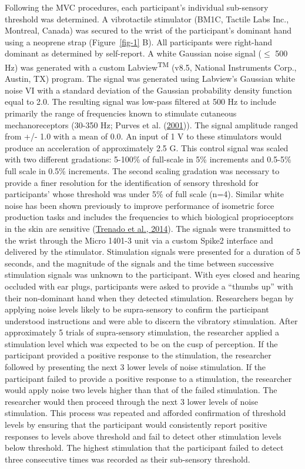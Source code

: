\documentclass[]{cik}%
\begin{document}
Following the MVC procedures, each participant's individual sub-sensory
threshold was determined. A vibrotactile stimulator (BM1C, Tactile Labs
Inc., Montreal, Canada) was secured to the wrist of the participant's
dominant hand using a neoprene strap (Figure~\ref{fig-1} B). All
participants were right-hand dominant as determined by self-report. A
white Gaussian noise signal (\(\le\) 500 Hz) was generated with a custom
Labview\textsuperscript{TM} (v8.5, National Instruments Corp., Austin,
TX) program. The signal was generated using Labview's Gaussian white
noise VI with a standard deviation of the Gaussian probability density
function equal to 2.0. The resulting signal was low-pass filtered at 500
Hz to include primarily the range of frequencies known to stimulate
cutaneous mechanoreceptors (30-350 Hz; Purves et al.
(\protect\hyperlink{ref-purves2001}{2001})). The signal amplitude ranged
from +/- 1.0 with a mean of 0.0. An input of 1 V to these stimulators
would produce an acceleration of approximately 2.5 G. This control
signal was scaled with two different gradations: 5-100\% of full-scale
in 5\% increments and 0.5-5\% full scale in 0.5\% increments. The second
scaling gradation was necessary to provide a finer resolution for the
identification of sensory threshold for participants' whose threshold
was under 5\% of full scale (n=4). Similar white noise has been shown
previously to improve performance of isometric force production tasks
and includes the frequencies to which biological proprioceptors in the
skin are sensitive (\protect\hyperlink{ref-Trenado2014}{Trenado et al.,
2014}). The signals were transmitted to the wrist through the Micro
1401-3 unit via a custom Spike2 interface and delivered by the
stimulator. Stimulation signals were presented for a duration of 5
seconds, and the magnitude of the signals and the time between
successive stimulation signals was unknown to the participant. With eyes
closed and hearing occluded with ear plugs, participants were asked to
provide a ``thumbs up'' with their non-dominant hand when they detected
stimulation. Researchers began by applying noise levels likely to be
supra-sensory to confirm the participant understood instructions and
were able to discern the vibratory stimulation. After approximately 5
trials of supra-sensory stimulation, the researcher applied a
stimulation level which was expected to be on the cusp of perception. If
the participant provided a positive response to the stimulation, the
researcher followed by presenting the next 3 lower levels of noise
stimulation. If the participant failed to provide a positive response to
a stimulation, the researcher would apply noise two levels higher than
that of the failed stimulation. The researcher would then proceed
through the next 3 lower levels of noise stimulation. This process was
repeated and afforded confirmation of threshold levels by ensuring that
the participant would consistently report positive responses to levels
above threshold and fail to detect other stimulation levels below
threshold. The highest stimulation that the participant failed to detect
three consecutive times was recorded as their sub-sensory threshold.
\end{document}
